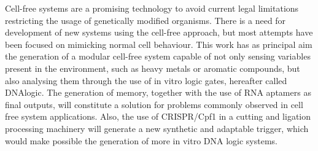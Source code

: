Cell-free systems are a promising technology to avoid current legal limitations restricting the usage of genetically modified organisms. There is a need for development of new systems using the cell-free approach, but most attempts have been focused on mimicking normal cell behaviour. This work has as principal aim the generation of a modular cell-free system capable of not only sensing variables present in the environment, such as heavy metals or aromatic compounds, but also analysing them through the use of in vitro logic gates, hereafter called DNAlogic. The generation of memory, together with the use of RNA aptamers as final outputs, will constitute a solution for problems commonly observed in cell free system applications. Also, the use of CRISPR/Cpf1 in a cutting and ligation processing machinery will generate a new synthetic and adaptable trigger, which would make possible the generation of more in vitro DNA logic systems. 